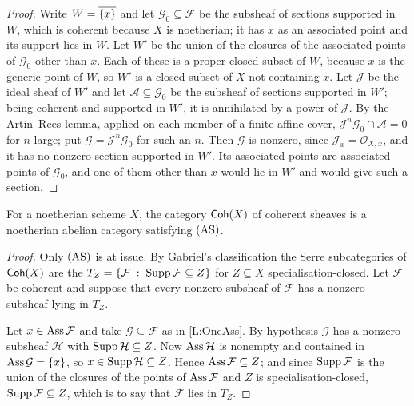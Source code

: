 \begin{proof}
  
  Write \(W=\overline{\{x\}}\) and let \(\mathcal{G}_{0}\subseteq\mathcal{F}\) be the subsheaf of sections supported in \(W\), which is coherent because \(X\) is noetherian; it has \(x\) as an associated point and its support lies in \(W\). Let \(W'\) be the union of the closures of the associated points of \(\mathcal{G}_{0}\) other than \(x\). Each of these is a proper closed subset of \(W\), because \(x\) is the generic point of \(W\), so \(W'\) is a closed subset of \(X\) not containing \(x\). Let \(\mathcal{J}\) be the ideal sheaf of \(W'\) and let \(\mathcal{A}\subseteq\mathcal{G}_{0}\) be the subsheaf of sections supported in \(W'\); being coherent and supported in \(W'\), it is annihilated by a power of \(\mathcal{J}\). By the Artin--Rees lemma, applied on each member of a finite affine cover, \(\mathcal{J}^{n}\mathcal{G}_{0}\cap\mathcal{A}=0\) for \(n\) large; put \(\mathcal{G}=\mathcal{J}^{n}\mathcal{G}_{0}\) for such an \(n\). Then \(\mathcal{G}\) is nonzero, since \(\mathcal{J}_{x}=\mathcal{O}_{X,x}\), and it has no nonzero section supported in \(W'\). Its associated points are associated points of \(\mathcal{G}_{0}\), and one of them other than \(x\) would lie in \(W'\) and would give such a section.
\end{proof}

\begin{proposition}
  \label{P:CohAS} 
  For a noetherian scheme \(X\), the category \(\mathsf{Coh}(X)\) of coherent sheaves is a noetherian abelian category satisfying \(\textup{(AS)}\).
\end{proposition}

\begin{proof}
  Only \(\textup{(AS)}\) is at issue. By Gabriel's classification \cite[Proposition~VI.2.4]{Gabriel62} the Serre subcategories of \(\mathsf{Coh}(X)\) are the \(T_{Z}=\{\mathcal{F}\;:\;\operatorname{Supp}\mathcal{F}\subseteq Z\}\) for \(Z\subseteq X\) specialisation-closed. Let \(\mathcal{F}\) be coherent and suppose that every nonzero subsheaf of \(\mathcal{F}\) has a nonzero subsheaf lying in \(T_{Z}\).

	Let \(x\in\operatorname{Ass}\mathcal{F}\) and take \(\mathcal{G}\subseteq\mathcal{F}\) as in \lemx\ref{L:OneAss}. By hypothesis \(\mathcal{G}\) has a nonzero subsheaf \(\mathcal{H}\) with \(\operatorname{Supp}\mathcal{H}\subseteq Z\). Now \(\operatorname{Ass}\mathcal{H}\) is nonempty and contained in \(\operatorname{Ass}\mathcal{G}=\{x\}\), so \(x\in\operatorname{Supp}\mathcal{H}\subseteq Z\). Hence \(\operatorname{Ass}\mathcal{F}\subseteq Z\); and since \(\operatorname{Supp}\mathcal{F}\) is the union of the closures of the points of \(\operatorname{Ass}\mathcal{F}\) \cite[Tag~05AL]{Stacks} and \(Z\) is specialisation-closed, \(\operatorname{Supp}\mathcal{F}\subseteq Z\), which is to say that \(\mathcal{F}\) lies in \(T_{Z}\).
\end{proof}

